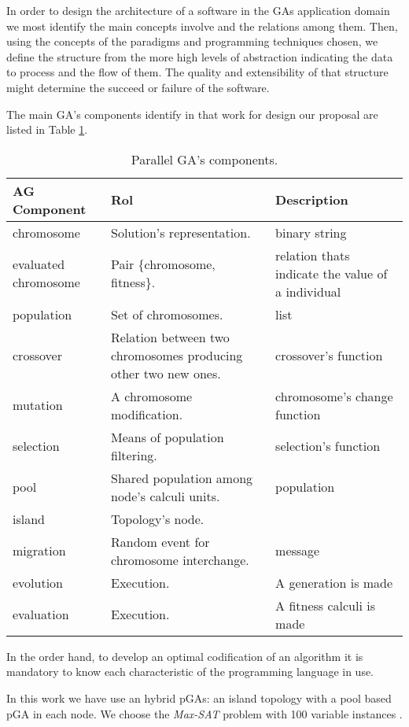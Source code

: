 
In order to design the architecture of a software in the GAs application domain we most identify the main concepts involve and the relations among them. Then, using the concepts of the paradigms and programming techniques chosen, we define the structure from the more high levels of abstraction indicating the data to process and the flow of them. The quality and extensibility of that structure might determine the succeed or failure of the software.

The main GA’s components identify in that work for design our proposal are listed in Table \ref{agpComp}.

\begin{table}
  \centering
  \caption{Parallel GA's components.}\label{agpComp}
   \begin{tabular}{|>{\centering}p{3cm}|p{5cm}|p{3cm}|}
   \hline
   \textbf{AG Component} & \textbf{Rol} & \textbf{Description} \\
     \hline
      chromosome & Solution's representation. & binary string \\
     \hline
      evaluated chromosome & Pair \{chromosome, fitness\}. & relation thats indicate the value of a individual\\
     \hline
      population & Set of chromosomes. & list \\
     \hline
     crossover & Relation between two chromosomes producing other two new ones. & crossover's function \\
     \hline
      mutation & A chromosome modification. & chromosome's change function \\
     \hline
     selection & Means of population filtering. & selection's function \\
     \hline
      pool & Shared population among node's calculi units. & population \\
     \hline
      island & Topology's node. &  \\
     \hline
      migration & Random event for chromosome interchange. & message \\
     \hline
      evolution & Execution. & A generation is made \\
     \hline
      evaluation & Execution. & A fitness calculi is made \\
     \hline
   \end{tabular}

\end{table}

In the order hand, to develop an optimal codification of an algorithm it is mandatory to know each characteristic of the programming language in use.

In this work we have use an hybrid pGAs: an island topology with a pool based pGA in each node. We choose the {\em Max-SAT} problem with 100 variable instances \cite{Hoos2000}.
